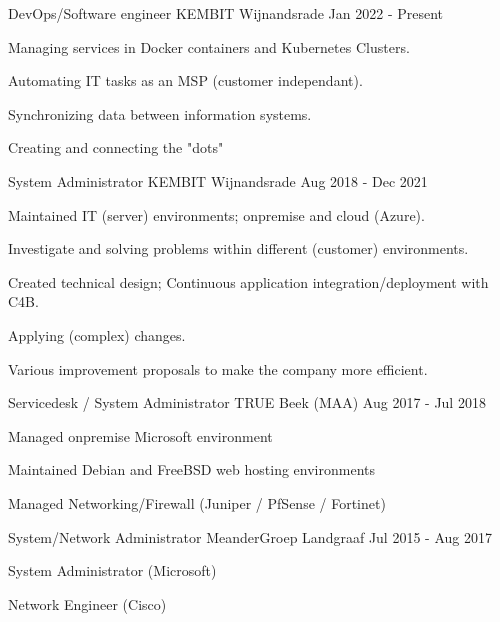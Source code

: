 \documentclass[11pt, letterpaper]{awesome-cv}
\begin{document}
\begin{cventries}


  \cventry
    {DevOps/Software engineer}
    {KEMBIT}
    {Wijnandsrade}
    {Jan 2022 - Present}
    {
      \begin{cvitems}
        \item{Managing services in Docker containers and Kubernetes Clusters.}
        \item{Automating IT tasks as an MSP (customer independant).}
        \item{Synchronizing data between information systems.}
        \item{Creating and connecting the "dots"}
      \end{cvitems}
    }


  \cventry
    {System Administrator}
    {KEMBIT}
    {Wijnandsrade}
    {Aug 2018 - Dec 2021}
    {
      \begin{cvitems}
        \item{Maintained IT (server) environments; onpremise and cloud (Azure).}
        \item{Investigate and solving problems within different (customer) environments.}
        \item{Created technical design; Continuous application integration/deployment with C4B.}
        \item{Applying (complex) changes.}
        \item{Various improvement proposals to make the company more efficient.}
      \end{cvitems}
    }


  \cventry
    {Servicedesk / System Administrator}
    {TRUE}
    {Beek (MAA)}
    {Aug 2017 - Jul 2018}
    {
      \begin{cvitems}
        \item{Managed onpremise Microsoft environment}
        \item{Maintained Debian and FreeBSD web hosting environments}
        \item{Managed Networking/Firewall (Juniper / PfSense / Fortinet)}
      \end{cvitems}
    }


  \cventry
    {System/Network Administrator}
    {MeanderGroep}
    {Landgraaf}
    {Jul 2015 - Aug 2017}
    {
      \begin{cvitems}
        \item{System Administrator (Microsoft)}
        \item{Network Engineer (Cisco)}
      \end{cvitems}
    }



\end{cventries}
\end{document}
